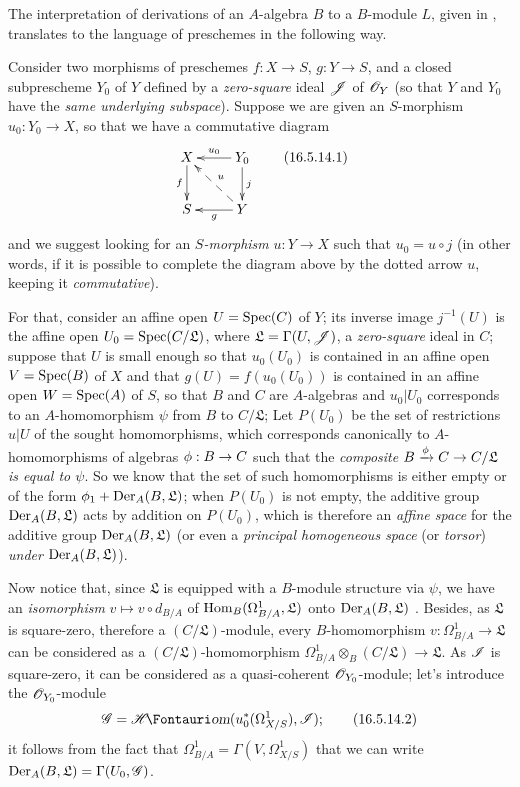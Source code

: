 \begin{env}[16.5.14]
\label{IV.16.5.14}
The interpretation of derivations of an $A$-algebra $B$ to a $B$-module $L$, given in , translates to the language of preschemes in the following way.

Consider two morphisms of preschemes $f : X \to S$, $g : Y \to S$, and a closed subprescheme $Y_0$ of $Y$ defined by a \emph{zero-square} ideal $\mathscr{J}$ of $\mathscr{O}_Y$ (so that $Y$ and $Y_0$ have the \emph{same underlying subspace}).
Suppose we are given an $S$-morphism $u_0 : Y_0 \to X$, so that we have a commutative diagram
\[
\label{IV.16.5.14.1}
  \xymatrix{
    X \ar[d]_-f & Y_0 \ar[l]_-{u_0}\ar[d]^j \\
    S & Y \ar@{-->}[ul]_-u \ar[l]^-g
  }
  \tag{16.5.14.1}
\]
and we suggest looking for an \emph{$S$-morphism} $u : Y \to X$ such that $u_0 = u \circ j$ (in other words, if it is possible to complete the diagram above by the dotted arrow $u$, keeping it \emph{commutative}).

For that, consider an affine open $U = \operatorname{Spec}(C)$ of $Y$;
its inverse image $j^{-1}(U)$ is the affine open $U_0 = \operatorname{Spec}(C/\mathfrak{L})$, where $\mathfrak{L} = \Gamma(U, \mathscr{J})$, a \emph{zero-square} ideal in $C$;
suppose that $U$ is small enough so that $u_0(U_0)$ is contained in an affine open $V = \operatorname{Spec}(B)$ of $X$ and that $g(U) = f(u_0(U_0))$ is contained in an affine open $W = \operatorname{Spec}(A)$ of $S$, so that $B$ and $C$ are $A$-algebras and $u_0|U_0$ corresponds to an $A$-homomorphism $\psi$ from $B$ to $C/\mathfrak{L}$;
Let $P(U_0)$ be the set of restrictions $u|U$ of the sought homomorphisms, which corresponds canonically to $A$-homomorphisms of algebras $\vphi : B \to C$ such that the \emph{composite $B \xrightarrow{\vphi} C \to C/\mathfrak{L}$ is equal to $\psi$}.
So we know  that the set of such homomorphisms is either empty or of the form $\phi_1 + \operatorname{Der}_A(B, \mathfrak{L})$;
when $P(U_0)$ is not empty, the additive group $\operatorname{Der}_A(B, \mathfrak{L})$ acts by addition on $P(U_0)$, which is therefore an \emph{affine space} for the additive group $\operatorname{Der}_A(B, \mathfrak{L})$ (or even a \emph{principal homogeneous space} (or \emph{torsor}) \emph{under} $\operatorname{Der}_A(B, \mathfrak{L})$).

Now notice that, since $\mathfrak{L}$ is equipped with a $B$-module structure via $\psi$, we have an \emph{isomorphism} $v \mapsto v \circ d_{B/A}$ of $\operatorname{Hom}_B(\Omega_{B/A}^1, \mathfrak{L})$ onto $\operatorname{Der}_A(B, \mathfrak{L})$ .
Besides, as $\mathfrak{L}$ is square-zero, therefore a $(C/\mathfrak{L})$-module, every $B$-homomorphism $v : \Omega_{B/A}^1 \to \mathfrak{L}$ can be considered as a $(C/\mathfrak{L})$-homomorphism $\Omega_{B/A}^1 \otimes_B (C/\mathfrak{L}) \to \mathfrak{L}$.
As $\mathscr{I}$ is square-zero, it can be considered as a quasi-coherent $\mathscr{O}_{Y_0}$-module;
let's introduce the $\mathscr{O}_{Y_0}$-module
\[
\label{IV.16.5.14.2}
  \sh{G} = \shHom(u_0^*(\Omega_{X/S}^1), \sh{I});
  \tag{16.5.14.2}
\]
it follows from the fact that $\Omega_{B/A}^1 = \Gamma(V, \Omega_{X/S}^1)$  that we can write $\operatorname{Der}_A(B, \mathfrak{L}) = \Gamma(U_0, \mathscr{G})$.


\end{env}
